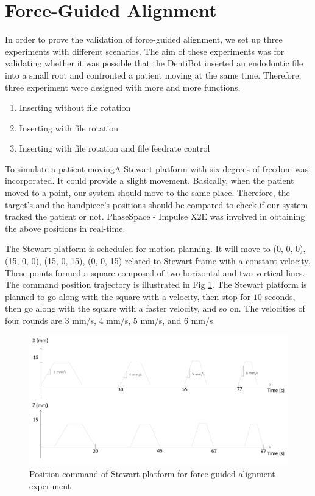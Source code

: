 \section{Force-Guided Alignment}
\hspace*{6mm}In order to prove the validation of force-guided alignment, we set up three experiments with different scenarios. The aim of these experiments was for validating whether it was possible that the DentiBot inserted an endodontic file into a small root and confronted a patient moving at the same time. Therefore, three experiment were designed with more and more functions.
\begin{enumerate}
\item[1.1] Inserting without file rotation
\item[1.2] Inserting with file rotation
\item[1.3] Inserting with file rotation and file feedrate control
\end{enumerate}
\par
To simulate a patient movingA Stewart platform with six degrees of freedom was incorporated. It could provide a slight movement. Basically, when the patient moved to a point, our system should move to the same place. Therefore, the target's and the handpiece's positions should be compared to check if our system tracked the patient or not. PhaseSpace - Impulse X2E was involved in obtaining the above positions in real-time. 
\par
The Stewart platform is scheduled for motion planning. It will move to (0, 0, 0), (15, 0, 0), (15, 0, 15), (0, 0, 15) related to Stewart frame with a constant velocity. These points formed a square composed of two horizontal and two vertical lines. The command position trajectory is illustrated in Fig \ref{fig: position command}. The Stewart platform is planned to go along with the square with a velocity, then stop for $10$ seconds, then go along with the square with a faster velocity, and so on. The velocities of four rounds are $3$ mm/s, $4$ mm/s, $5$ mm/s, and $6$ mm/s.
	
\begin{figure}[htbp]
\begin{center}
\includegraphics[width=1\linewidth]{Images/position command.png}
\caption{Position command of Stewart platform for force-guided alignment experiment}
\label{fig: position command}
\end{center}
\end{figure}	

